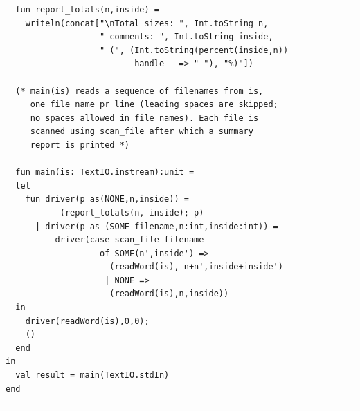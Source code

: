 \documentclass[12pt]{book}
\begin{document}
\begin{verbatim}
  fun report_totals(n,inside) = 
    writeln(concat["\nTotal sizes: ", Int.toString n,
                   " comments: ", Int.toString inside,
                   " (", (Int.toString(percent(inside,n)) 
                          handle _ => "-"), "%)"])

  (* main(is) reads a sequence of filenames from is,
     one file name pr line (leading spaces are skipped;
     no spaces allowed in file names). Each file is 
     scanned using scan_file after which a summary
     report is printed *)

  fun main(is: TextIO.instream):unit =
  let 
    fun driver(p as(NONE,n,inside)) = 
           (report_totals(n, inside); p)
      | driver(p as (SOME filename,n:int,inside:int)) =
          driver(case scan_file filename 
                   of SOME(n',inside') =>
                     (readWord(is), n+n',inside+inside')
                    | NONE =>
                     (readWord(is),n,inside))
  in
    driver(readWord(is),0,0);
    ()
  end
in 
  val result = main(TextIO.stdIn)
end
\end{verbatim}
\hrule
\bigskip
\end{document}
